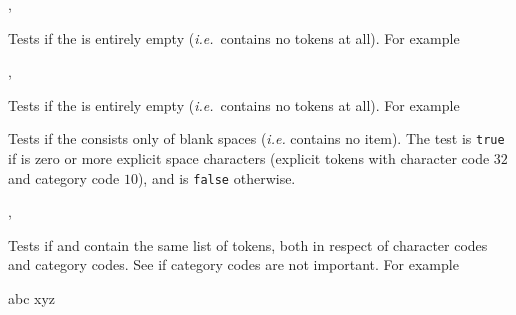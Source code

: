 \documentclass[oneside]{book}
\begin{document}
\begin{function}{\TlIfEmpty,\TlIfEmptyTF}
\begin{syntax}
 
   
\end{syntax}
Tests if the  is entirely empty
(\emph{i.e.}~contains no tokens at all). For example
\begin{demohigh}
 {} {}
\TlIfEmptyTF {} {} {}
\end{demohigh}
\end{function}

\begin{function}{\TlVarIfEmpty,\TlVarIfEmptyTF}
\begin{syntax}
 
   
\end{syntax}
Tests if the  is entirely empty
(\emph{i.e.}~contains no tokens at all). For example
\begin{demohigh}
\TlSet {}
\TlVarIfEmptyTF {} {}
\TlClear \lTmpaTl
\TlVarIfEmptyTF {} {}
\end{demohigh}
\end{function}

\begin{function}{\TlIfBlank}
\begin{syntax}
 
   
\end{syntax}
Tests if the  consists only of blank spaces
(\emph{i.e.} contains no item). The test is \texttt{true} if
 is zero or more explicit space characters
(explicit tokens with character code $32$ and category code $10$),
and is \texttt{false} otherwise.
\end{function}

\begin{function}{\TlIfEq,\TlIfEqTF}
\begin{syntax}
  
    
\end{syntax}
Tests if  and  contain the
same list of tokens, both in respect of character codes and category
codes. See  if category codes are not important.
For example
\begin{demohigh}
 {abc} {} {}
 {xyz} {} {}
\end{demohigh}
\end{function}
\end{document}
